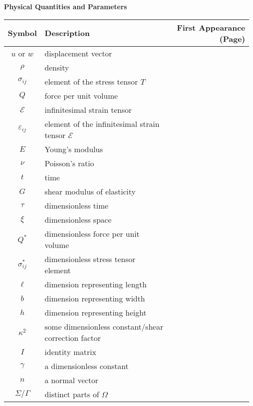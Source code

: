 \documentclass[main.tex]{subfiles}
\begin{document}
\noindent
\textbf{Physical Quantities and Parameters}\\
\begin{tabularx}{\textwidth}{cXr}
\toprule
Symbol & Description & First Appearance (Page) \\ 
\midrule
\( u \) or \( w \) & displacement vector & \pageref{sym:u} \\
\( \rho \) & density & \pageref{sym:rho} \\
\( \sigma_{ij} \) & element of the stress tensor \( T \) & \pageref{sym:sigmaij} \\
\( Q \) & force per unit volume & \pageref{sym:Q} \\
\( \mathcal{E} \) & infinitesimal strain tensor & \pageref{sym:mathcalE} \\
\( \varepsilon_{ij} \) & element of the infinitesimal strain tensor \( \mathcal{E} \) & \pageref{sym:varepsilonij} \\
\( E \) & Young's modulus & \pageref{sym:E} \\
\( \nu \) & Poisson's ratio & \pageref{sym:nu} \\
\( t \) & time & \pageref{sym:t} \\
\( G \) & shear modulus of elasticity & \pageref{sym:G} \\
\( \tau \) & dimensionless time & \pageref{sym:tau} \\
\( \xi \) & dimensionless space & \pageref{sym:xi} \\
\( Q^* \) & dimensionless force per unit volume & \pageref{sym:Qstar} \\
\( \sigma^*_{ij} \) & dimensionless stress tensor element & \pageref{sym:sigmaijstar} \\
\( \ell \) & dimension representing length & \pageref{sym:ell} \\
\( b \) &  dimension representing width & \pageref{sym:width} \\
\( h \) & dimension representing height & \pageref{sym:height} \\
\( \kappa^2 \) & some dimensionless constant/shear correction factor & \pageref{sym:kappa2} \\
\( I \) & identity matrix & \pageref{sym:I} \\
\( \gamma \) & a dimensionless constant & \pageref{sym:gamma} \\
\( n \) & a normal vector & \pageref{sym:n} \\
\( \Sigma/\Gamma \) & distinct parts of \( \Omega \) & \pageref{sym:SigmaGamma} \\

\end{tabularx}
\end{document}
